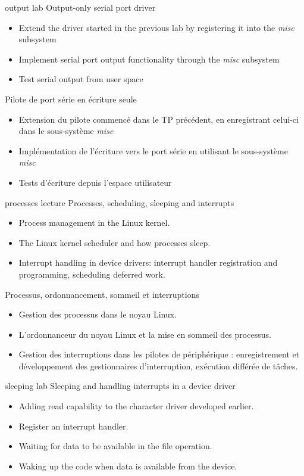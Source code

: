 {output}
{lab}
{Output-only serial port driver}
{
  \begin{itemize}
  \item Extend the driver started in the previous lab by registering
    it into the {\em misc} subsystem
  \item Implement serial port output functionality through the {\em
      misc} subsystem
  \item Test serial output from user space
  \end{itemize}
}
{Pilote de port série en écriture seule}
{
  \begin{itemize}
  \item Extension du pilote commencé dans le TP précédent, en
    enregistrant celui-ci dans le sous-système {\em misc}
  \item Implémentation de l'écriture vers le port série en
    utilisant le sous-système {\em misc}
  \item Tests d'écriture depuis l'espace utilisateur
  \end{itemize}
}
{processes}
{lecture}
{Processes, scheduling, sleeping and interrupts}
{
  \begin{itemize}
  \item Process management in the Linux kernel.
  \item The Linux kernel scheduler and how processes sleep.
  \item Interrupt handling in device drivers: interrupt handler
    registration and programming, scheduling deferred work.
  \end{itemize}
}
{Processus, ordonnancement, sommeil et interruptions}
{
  \begin{itemize}
  \item Gestion des processus dans le noyau Linux.
  \item L'ordonnanceur du noyau Linux et la mise en sommeil des processus.
  \item Gestion des interruptions dans les pilotes de périphérique :
    enregistrement et développement des gestionnaires d'interruption,
    exécution différée de tâches.
  \end{itemize}
}
{sleeping}
{lab}
{Sleeping and handling interrupts in a device driver}
{
  \begin{itemize}
  \item Adding read capability to the character driver developed
    earlier.
  \item Register an interrupt handler.
  \item Waiting for data to be available in the  file operation.
  \item Waking up the code when data is available from the device.
  \end{itemize}
}
